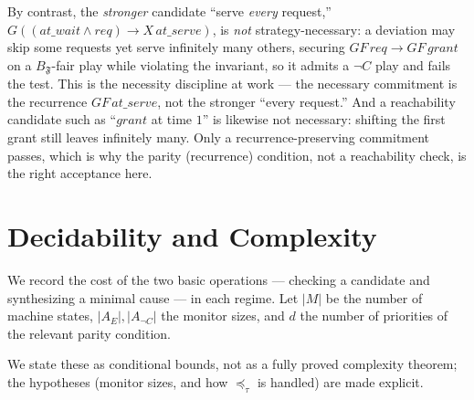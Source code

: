 \documentclass[11pt]{article}
\theoremstyle{remark}
\newcommand{\Frame}{\mathfrak{F}}
\begin{document}
By contrast, the \emph{stronger} candidate ``serve \emph{every} request,''
\(G((\mathit{at\_wait}\wedge req)\rightarrow X\,\mathit{at\_serve})\), is
\emph{not} strategy-necessary: a deviation may skip some requests yet serve
infinitely many others, securing \(GF\,req\rightarrow GF\,grant\) on a
\(B_{\Frame}\)-fair play while violating the invariant, so it admits a \(\neg C\)
play and fails the test. This is the
necessity discipline at work --- the necessary commitment is the recurrence
\(GF\,\mathit{at\_serve}\), not the stronger ``every request.'' And a reachability
candidate such as ``\(grant\) at time \(1\)'' is likewise not necessary: shifting
the first grant still leaves infinitely many. Only a recurrence-preserving
commitment passes, which is why the parity (recurrence) condition, not a
reachability check, is the right acceptance here.

\section{Decidability and Complexity}
\label{sec:complexity}

We record the cost of the two basic operations --- checking a candidate and
synthesizing a minimal cause --- in each regime. Let \(|M|\) be the number of
machine states, \(|A_E|,|A_{\neg C}|\) the monitor sizes, and \(d\) the number of
priorities of the relevant parity condition.

We state these as conditional bounds, not as a fully proved complexity theorem;
the hypotheses (monitor sizes, and how \(\preceq_\tau\) is handled) are made
explicit.
\end{document}
